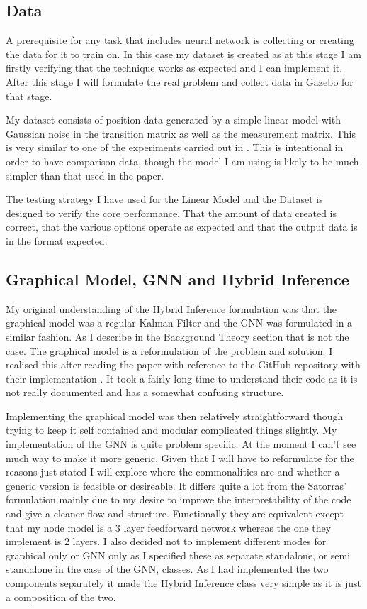 \documentclass[]{../resources/final_report}
\begin{document}
\subsection{Data}
A prerequisite for any task that includes neural network is collecting or creating the data for it 
to train on. In this case my dataset is created as at this stage I am firstly verifying that the 
technique works as expected and I can implement it. After this stage I will formulate the real 
problem and collect data in Gazebo for that stage.

My dataset consists of position data generated by a simple linear model with Gaussian noise in the 
transition matrix as well as the measurement matrix. This is very similar to one of the experiments 
carried out in \cite{HybridInference}. This is intentional in order to have comparison data,
though the model I am using is likely to be much simpler than that used in the paper.

The testing strategy I have used for the Linear Model and the Dataset is designed to verify the core
performance. That the amount of data created is correct, that the various options operate as expected 
and that the output data is in the format expected.

\subsection{Graphical Model, GNN and Hybrid Inference}

My original understanding of the Hybrid Inference formulation was that the graphical model was a 
regular Kalman Filter and the GNN was formulated in a similar fashion. As I describe in the Background 
Theory section that is not the case. The graphical model is a reformulation of the problem and 
solution. I realised this after reading the paper with reference to the GitHub repository with their 
implementation \cite{vgsatorrasgithub}. It took a fairly long time to understand their code as it is 
not really documented and has a somewhat confusing structure.

Implementing the graphical model was then relatively straightforward though trying to keep it self 
contained and modular complicated things slightly. My implementation of the GNN is quite problem 
specific. At the moment I can't see much way to make it more generic. Given that I will have to 
reformulate for the reasons just stated I will explore where the commonalities are and whether a 
generic version is feasible or desireable. It differs quite a lot from the Satorras' formulation 
mainly due to my desire to improve the interpretability of the code and give a cleaner flow and 
structure. Functionally they are equivalent except that my node model is a 3 layer feedforward 
network whereas the one they implement is 2 layers. I also decided not to implement different 
modes for graphical only or GNN only as I specified these as separate standalone, or semi 
standalone in the case of the GNN, classes. As I had implemented the two components separately 
it made the Hybrid Inference class very simple as it is just a composition of the two.
\end{document}
